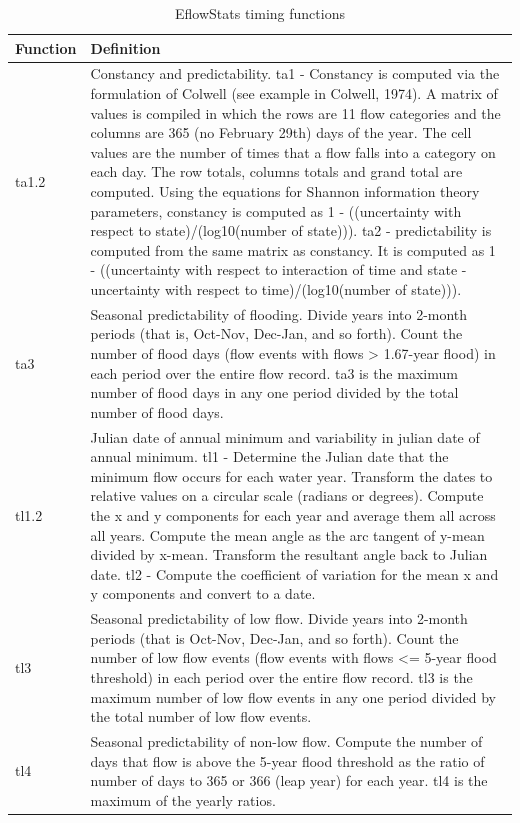 \documentclass[a4paper,11pt]{article}\usepackage[]{graphicx}\usepackage[]{color}
\begin{document}
\begin{table}[ht]
  \centering
  \begin{threeparttable}[b]
  \caption{EflowStats timing functions}
  \label{tab:timStats}
\begin{tabularx}{\textwidth}{|l|X|}
  \hline
\textbf{Function} & \textbf{Definition} \\ 
  \hline
  ta1.2 & Constancy and predictability. ta1 - Constancy is computed via the formulation of Colwell (see example in Colwell, 1974). A matrix of values is compiled in which the rows are 11 flow categories and the columns are 365 (no February 29th) days of the year. The cell values are the number of times that a flow falls into a category on each day. The row totals, columns totals and grand total are computed. Using the equations for Shannon information theory parameters, constancy is computed as 1 - ((uncertainty with respect to state)/(log10(number of state))). ta2 - predictability is computed from the same matrix as constancy. It is computed as 1 - ((uncertainty with respect to interaction of time and state - uncertainty with respect to time)/(log10(number of state))). \\
  ta3 & Seasonal predictability of flooding. Divide years into 2-month periods (that is, Oct-Nov, Dec-Jan, and so forth). Count the number of flood days (flow events with flows > 1.67-year flood) in each period over the entire flow record. ta3 is the maximum number of flood days in any one period divided by the total number of flood days. \\
  tl1.2 & Julian date of annual minimum and variability in julian date of annual minimum. tl1 - Determine the Julian date that the minimum flow occurs for each water year. Transform the dates to relative values on a circular scale (radians or degrees). Compute the x and y components for each year and average them all across all years. Compute the mean angle as the arc tangent of y-mean divided by x-mean. Transform the resultant angle back to Julian date. tl2 - Compute the coefficient of variation for the mean x and y components and convert to a date. \\
  tl3 & Seasonal predictability of low flow. Divide years into 2-month periods (that is Oct-Nov, Dec-Jan, and so forth). Count the number of low flow events (flow events with flows <= 5-year flood threshold) in each period over the entire flow record. tl3 is the maximum number of low flow events in any one period divided by the total number of low flow events. \\
  tl4 & Seasonal predictability of non-low flow. Compute the number of days that flow is above the 5-year flood threshold as the ratio of number of days to 365 or 366 (leap year) for each year. tl4 is the maximum of the yearly ratios. \\

\end{tabularx}
\end{threeparttable}
\end{table}
\end{document}
